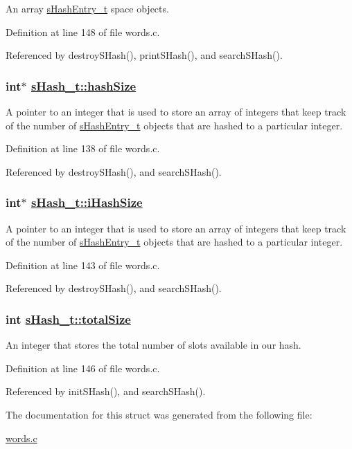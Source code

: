 An array \hyperlink{structsHashEntry__t}{s\-Hash\-Entry\_\-t} space objects. 

Definition at line 148 of file words.c.

Referenced by destroy\-SHash(), print\-SHash(), and search\-SHash().\hypertarget{structsHash__t_o0}{
\subsubsection[hashSize]{\setlength{\rightskip}{0pt plus 5cm}int$\ast$ \hyperlink{structsHash__t_o0}{s\-Hash\_\-t::hash\-Size}}}
\label{structsHash__t_o0}


A pointer to an integer that is used to store an array of integers that keep track of the number of \hyperlink{structsHashEntry__t}{s\-Hash\-Entry\_\-t} objects that are hashed to a particular integer. 

Definition at line 138 of file words.c.

Referenced by destroy\-SHash(), and search\-SHash().\hypertarget{structsHash__t_o1}{
\subsubsection[iHashSize]{\setlength{\rightskip}{0pt plus 5cm}int$\ast$ \hyperlink{structsHash__t_o1}{s\-Hash\_\-t::i\-Hash\-Size}}}
\label{structsHash__t_o1}


A pointer to an integer that is used to store an array of integers that keep track of the number of \hyperlink{structsHashEntry__t}{s\-Hash\-Entry\_\-t} objects that are hashed to a particular integer. 

Definition at line 143 of file words.c.

Referenced by destroy\-SHash(), and search\-SHash().\hypertarget{structsHash__t_o2}{
\subsubsection[totalSize]{\setlength{\rightskip}{0pt plus 5cm}int \hyperlink{structsHash__t_o2}{s\-Hash\_\-t::total\-Size}}}
\label{structsHash__t_o2}


An integer that stores the total number of slots available in our hash. 

Definition at line 146 of file words.c.

Referenced by init\-SHash(), and search\-SHash().

The documentation for this struct was generated from the following file:\begin{CompactItemize}
\item 
\hyperlink{words_8c}{words.c}\end{CompactItemize}
